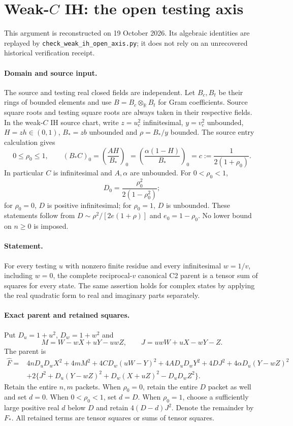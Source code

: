 \section{Weak-$C$ IH: the open testing axis}
\label{sec:weak-ih-open-axis}
This argument is reconstructed on 19 October 2026.  Its algebraic identities
are replayed by \texttt{check\_weak\_ih\_open\_axis.py}; it does not rely on an
unrecovered historical verification receipt.

\paragraph{Domain and source input.}
The source and testing real closed fields are independent.  Let $B_c,B_t$
be their rings of bounded elements and use $B=B_c\otimes_{\mathbb R}B_t$
for Gram coefficients.  Source square roots and testing square roots are
always taken in their respective fields.  In the weak-$C$ IH source chart,
write $z=u_c^2$ infinitesimal, $y=v_c^2$ unbounded,
$H=zh\in(0,1)$, $B_*=zb$ unbounded and $\rho=B_*/y$ bounded.
The source entry calculation gives
\[
 0\leq\rho_0\leq1,\qquad
 (B_*C)_0=\left(\frac{AH}{B_*}\right)_0
 =\left(\frac{\alpha(1-H)}{B_*}\right)_0
 =c:=\frac1{2(1+\rho_0)}.
\tag{OA1}
\]
In particular $C$ is infinitesimal and $A,\alpha$ are unbounded.
For $0<\rho_0<1$,
\[
 D_0=\frac{\rho_0^2}{2(1-\rho_0^2)};
\tag{OA2}
\]
for $\rho_0=0$, $D$ is positive infinitesimal; for $\rho_0=1$, $D$ is
unbounded.  These statements follow from
$D\sim\rho^2/[2e(1+\rho)]$ and $e_0=1-\rho_0$.
No lower bound on $n\geq0$ is imposed.

\paragraph{Statement.}
For every testing $u$ with nonzero finite residue and every infinitesimal
$w=1/v$, including $w=0$, the complete reciprocal-$v$ canonical C2 parent
is a tensor sum of squares for every state.  The same assertion holds for
complex states by applying the real quadratic form to real and imaginary
parts separately.

\paragraph{Exact parent and retained squares.}
Put $D_u=1+u^2$, $D_w=1+w^2$ and
\[
 M=W-wX+uY-uwZ,\qquad J=uwW+uX-wY-Z.
\]
The parent is
\begin{align*}
\widehat F={}&4nD_uD_wX^2+4mM^2+4CD_w(uW-Y)^2
 +4AD_uD_wY^2+4DJ^2+4\alpha D_u(Y-wZ)^2\\
&+2\{J^2+D_u(Y-wZ)^2+D_w(X+uZ)^2-D_uD_wZ^2\}.
\end{align*}
Retain the entire $n,m$ packets. When $\rho_0=0$, retain the entire
$D$ packet as well and set $d=0$. When $0<\rho_0<1$, set $d=D$.
When $\rho_0=1$, choose a sufficiently large positive real $d$ below $D$
and retain $4(D-d)J^2$.  Denote the remainder by $F_*$.  All retained
terms are tensor squares or sums of tensor squares.


